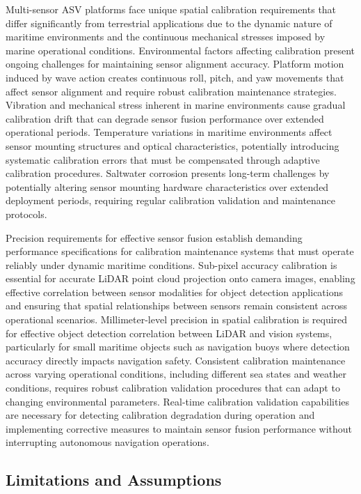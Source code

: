 \documentclass{erauthesis}
\begin{document}
Multi-sensor ASV platforms face unique spatial calibration requirements that differ significantly from terrestrial applications due to the dynamic nature of maritime environments and the continuous mechanical stresses imposed by marine operational conditions. Environmental factors affecting calibration present ongoing challenges for maintaining sensor alignment accuracy. Platform motion induced by wave action creates continuous roll, pitch, and yaw movements that affect sensor alignment and require robust calibration maintenance strategies. Vibration and mechanical stress inherent in marine environments cause gradual calibration drift that can degrade sensor fusion performance over extended operational periods. Temperature variations in maritime environments affect sensor mounting structures and optical characteristics, potentially introducing systematic calibration errors that must be compensated through adaptive calibration procedures. Saltwater corrosion presents long-term challenges by potentially altering sensor mounting hardware characteristics over extended deployment periods, requiring regular calibration validation and maintenance protocols.

Precision requirements for effective sensor fusion establish demanding performance specifications for calibration maintenance systems that must operate reliably under dynamic maritime conditions. Sub-pixel accuracy calibration is essential for accurate LiDAR point cloud projection onto camera images, enabling effective correlation between sensor modalities for object detection applications and ensuring that spatial relationships between sensors remain consistent across operational scenarios. Millimeter-level precision in spatial calibration is required for effective object detection correlation between LiDAR and vision systems, particularly for small maritime objects such as navigation buoys where detection accuracy directly impacts navigation safety. Consistent calibration maintenance across varying operational conditions, including different sea states and weather conditions, requires robust calibration validation procedures that can adapt to changing environmental parameters. Real-time calibration validation capabilities are necessary for detecting calibration degradation during operation and implementing corrective measures to maintain sensor fusion performance without interrupting autonomous navigation operations.

\subsection{Limitations and Assumptions}
\end{document}
